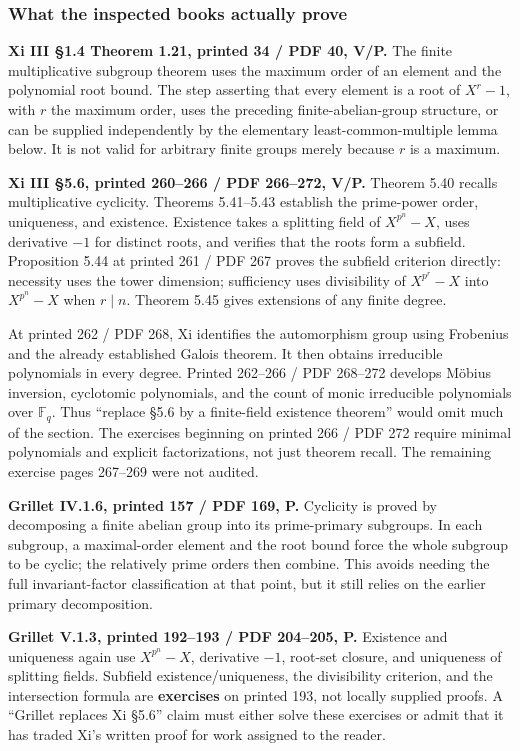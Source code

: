 \documentclass[
  11pt,
]{article}
\begin{document}
\subsubsection{What the inspected books actually
prove}\label{what-the-inspected-books-actually-prove}

\textbf{Xi III §1.4 Theorem 1.21, printed 34 / PDF 40, V/P.} The finite
multiplicative subgroup theorem uses the maximum order of an element and
the polynomial root bound. The step asserting that every element is a
root of \(X^r-1\), with \(r\) the maximum order, uses the preceding
finite-abelian-group structure, or can be supplied independently by the
elementary least-common-multiple lemma below. It is not valid for
arbitrary finite groups merely because \(r\) is a maximum.

\textbf{Xi III §5.6, printed 260--266 / PDF 266--272, V/P.} Theorem 5.40
recalls multiplicative cyclicity. Theorems 5.41--5.43 establish the
prime-power order, uniqueness, and existence. Existence takes a
splitting field of \(X^{p^n}-X\), uses derivative \(-1\) for distinct
roots, and verifies that the roots form a subfield. Proposition 5.44 at
printed 261 / PDF 267 proves the subfield criterion directly: necessity
uses the tower dimension; sufficiency uses divisibility of \(X^{p^r}-X\)
into \(X^{p^n}-X\) when \(r\mid n\). Theorem 5.45 gives extensions of
any finite degree.

At printed 262 / PDF 268, Xi identifies the automorphism group using
Frobenius and the already established Galois theorem. It then obtains
irreducible polynomials in every degree. Printed 262--266 / PDF 268--272
develops Möbius inversion, cyclotomic polynomials, and the count of
monic irreducible polynomials over \(\mathbb F_q\). Thus ``replace §5.6
by a finite-field existence theorem'' would omit much of the section.
The exercises beginning on printed 266 / PDF 272 require minimal
polynomials and explicit factorizations, not just theorem recall. The
remaining exercise pages 267--269 were not audited.

\textbf{Grillet IV.1.6, printed 157 / PDF 169, P.} Cyclicity is proved
by decomposing a finite abelian group into its prime-primary subgroups.
In each subgroup, a maximal-order element and the root bound force the
whole subgroup to be cyclic; the relatively prime orders then combine.
This avoids needing the full invariant-factor classification at that
point, but it still relies on the earlier primary decomposition.

\textbf{Grillet V.1.3, printed 192--193 / PDF 204--205, P.} Existence
and uniqueness again use \(X^{p^n}-X\), derivative \(-1\), root-set
closure, and uniqueness of splitting fields. Subfield
existence/uniqueness, the divisibility criterion, and the intersection
formula are \textbf{exercises} on printed 193, not locally supplied
proofs. A ``Grillet replaces Xi §5.6'' claim must either solve these
exercises or admit that it has traded Xi's written proof for work
assigned to the reader.
\end{document}
